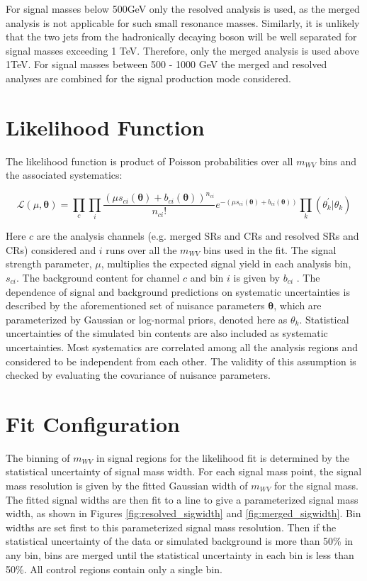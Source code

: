 For signal masses below 500GeV only the resolved analysis is used, as the merged analysis is not applicable for such small resonance masses. Similarly, it is unlikely that the two jets from the hadronically decaying boson will be well separated for signal masses exceeding 1 TeV. Therefore, only the merged analysis is used above 1TeV. For signal masses between 500 - 1000 GeV the merged and resolved analyses are combined for the signal production mode considered.

\section{Likelihood Function}
The likelihood function is product of Poisson probabilities over all $m_{WV}$ bins and the associated systematics:

\begin{equation}
\mathcal{L}(\mu,\bm{\theta})= \prod_{c} \prod_{i} \frac{(\mu s_{ci}(\bm{\theta}) + b_{ci}(\bm{\theta}))^{n_{ci}}}{n_{ci}!} e^{-(\mu s_{ci}(\bm{\theta})+b_{ci}(\bm{\theta}))}\prod_{k}(\theta^{'}_{k}|\theta_{k})
\end{equation}

Here $c$ are the analysis channels (e.g. merged SRs and CRs and resolved SRs and CRs) considered and $i$ runs over all the $m_{WV}$ bins used in the fit. The signal strength parameter, $\mu$, multiplies the expected signal yield in each analysis bin, $s_{ci}$. The background content for channel $c$ and bin $i$ is given by $b_{ci}$ . The dependence of signal and background predictions on systematic uncertainties is described by the aforementioned set of nuisance parameters $\bm{\theta}$, which are parameterized by Gaussian or log-normal priors, denoted here as $\theta_{k}$. Statistical uncertainties of the simulated bin contents are also included as systematic uncertainties. Most systematics are correlated among all the analysis regions and considered to be independent from each other. The validity of this assumption is checked by evaluating the covariance of nuisance parameters.  

\section{Fit Configuration}
The binning of $m_{WV}$ in signal regions for the likelihood fit is determined by the statistical uncertainty of signal mass width. For each signal mass point, the signal mass resolution is given by the fitted Gaussian width of $m_{WV}$ for the signal mass. The fitted signal widths are then fit to a line to give a parameterized signal mass width, as shown in Figures \ref{fig:resolved_sigwidth} and \ref{fig:merged_sigwidth}. Bin widths are set first to this parameterized signal mass resolution. Then if the statistical uncertainty of the data or simulated background is more than 50\% in any bin, bins are merged until the statistical uncertainty in each bin is less than 50\%. All control regions contain only a single bin.


